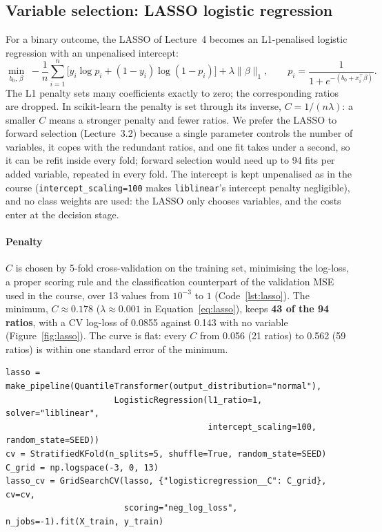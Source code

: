 \documentclass[11pt,a4paper]{article}
\begin{document}
\subsection{Variable selection: LASSO logistic regression}
For a binary outcome, the LASSO of Lecture~4 becomes an L1-penalised logistic regression with an unpenalised intercept:
\begin{equation}\label{eq:lasso}
  \min_{b_0,\,\beta}\; -\frac{1}{n}\sum_{i=1}^{n}\Big[y_i\log p_i + (1-y_i)\log(1-p_i)\Big] + \lambda\lVert\beta\rVert_1,
  \qquad p_i = \frac{1}{1+e^{-(b_0 + x_i^\top\beta)}} .
\end{equation}
The L1 penalty sets many coefficients exactly to zero; the corresponding ratios are dropped. In scikit-learn the penalty is set through its inverse, $C = 1/(n\lambda)$: a smaller $C$ means a stronger penalty and fewer ratios. We prefer the LASSO to forward selection (Lecture~3.2) because a single parameter controls the number of variables, it copes with the redundant ratios, and one fit takes under a second, so it can be refit inside every fold; forward selection would need up to 94 fits per added variable, repeated in every fold. The intercept is kept unpenalised as in the course (\texttt{intercept\_scaling=100} makes \texttt{liblinear}'s intercept penalty negligible), and no class weights are used: the LASSO only chooses variables, and the costs enter at the decision stage.

\paragraph{Penalty} $C$ is chosen by 5-fold cross-validation on the training set, minimising the log-loss, a proper scoring rule and the classification counterpart of the validation MSE used in the course, over 13 values from $10^{-3}$ to $1$ (Code~\ref{lst:lasso}). The minimum, $C \approx 0.178$ ($\lambda \approx 0.001$ in Equation~\eqref{eq:lasso}), keeps \textbf{43 of the 94 ratios}, with a CV log-loss of 0.0855 against 0.143 with no variable (Figure~\ref{fig:lasso}). The curve is flat: every $C$ from 0.056 (21 ratios) to 0.562 (59 ratios) is within one standard error of the minimum.

\begin{lstlisting}[float=htbp, caption={LASSO pipeline and choice of the penalty (notebook, Sections 2.1–2.2).}, label={lst:lasso}]
lasso = make_pipeline(QuantileTransformer(output_distribution="normal"),
                      LogisticRegression(l1_ratio=1, solver="liblinear",
                                         intercept_scaling=100, random_state=SEED))
cv = StratifiedKFold(n_splits=5, shuffle=True, random_state=SEED)
C_grid = np.logspace(-3, 0, 13)
lasso_cv = GridSearchCV(lasso, {"logisticregression__C": C_grid}, cv=cv,
                        scoring="neg_log_loss", n_jobs=-1).fit(X_train, y_train)
\end{lstlisting}
\end{document}
